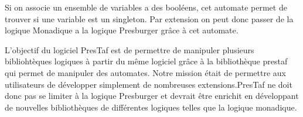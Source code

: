 Si on associe un ensemble de variables a des booléens, cet automate permet de trouver si une variable est un singleton. Par extension on peut donc passer de la logique Monadique a la logique Presburger grâce à cet automate.


L'objectif du logiciel PresTaf est de permettre de manipuler plusieurs bibliohtèques logiques à partir du même logiciel grâce à la bibliothèque prestaf qui permet de manipuler des automates. Notre mission était de permettre aux utilisateurs de développer simplement de nombreuses extensions.PresTaf ne doit donc pas se limiter à la logique Presburger et devrait être enrichit en développant de nouvelles bibliothèques de différentes logiques telles que la logique monadique. 
